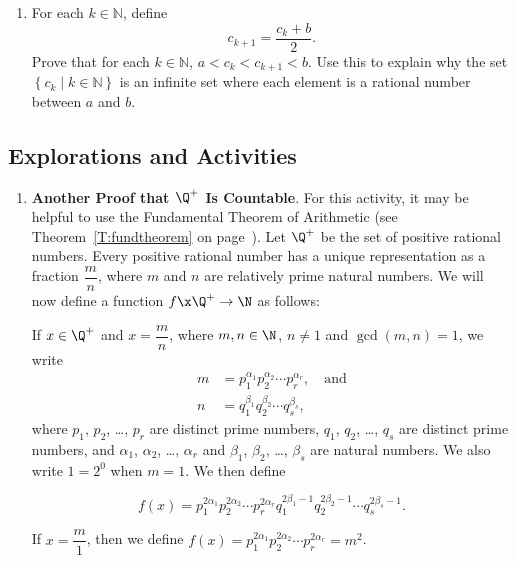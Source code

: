 \begin{enumerate}
\begin{enumerate}
\item For each $k \in \mathbb{N}$, define
\[
c_{k+1} = \frac{c_k + b}{2}.
\]
Prove that for each $k \in \mathbb{N}$, $a < c_k < c_{k+1} < b$.  Use this to explain why the set 
$\left\{ c_k \mid k \in \mathbb{N} \right\}$ is an infinite set where each element is a rational number between $a$ and $b$.
\end{enumerate}
\end{enumerate}



\subsection*{Explorations and Activities}
\setcounter{oldenumi}{\theenumi}
\begin{enumerate} \setcounter{enumi}{\theoldenumi}
\item \textbf{Another Proof that $\mathbf{\Q^+}$ Is Countable}. \label{A:Qcountable} 
For this activity, it may be helpful to use the Fundamental Theorem of Arithmetic (see Theorem~\ref{T:fundtheorem} on page~\pageref{T:fundtheorem}).  Let $\Q^+$ be the set of positive rational numbers.  Every positive rational number has a unique representation as a fraction $\dfrac{m}{n}$, where $m$ and $n$ are relatively prime natural numbers.
We will now define a function $f\x  \Q^+ \to \N$ as follows:

\eighth
\noindent
If $x \in \Q^+$ and $x = \dfrac{m}{n}$, where $m, n \in \N$, $n \ne 1$ and $\gcd(m, n) = 1$, we write
\[
\begin{aligned}
m &= p_1^{\alpha_1} p_2^{\alpha_2} \cdots p_r^{\alpha_r}, \quad \text{and} \\
n &= q_1^{\beta_1} q_2^{\beta_2} \cdots q_s^{\beta_s}, 
\end{aligned}
\]
where $p_1$, $p_2$, \ldots, $p_r$ are distinct prime numbers, $q_1$, $q_2$, \ldots, $q_s$ are distinct prime numbers, and 
$\alpha_1$, $\alpha_2$, \ldots, $\alpha_r$ and $\beta_1$, $\beta_2$, \ldots, $\beta_s$ are natural numbers.    
We also write $1 = 2^0$ when $m = 1$.  We then define

\[
f(x) = p_1^{2\alpha_1} p_2^{2\alpha_2} \cdots p_r^{2\alpha_r}
q_1^{2\beta_1 -1 } q_2^{2 \beta_2 - 1} \cdots q_s^{2 \beta_s - 1}.
\]

\noindent
If $x = \dfrac{m}{1}$, then we define 
$f(x) = p_1^{2\alpha_1} p_2^{2\alpha_2} \cdots p_r^{2\alpha_r} = m^2$.  


\end{enumerate}

